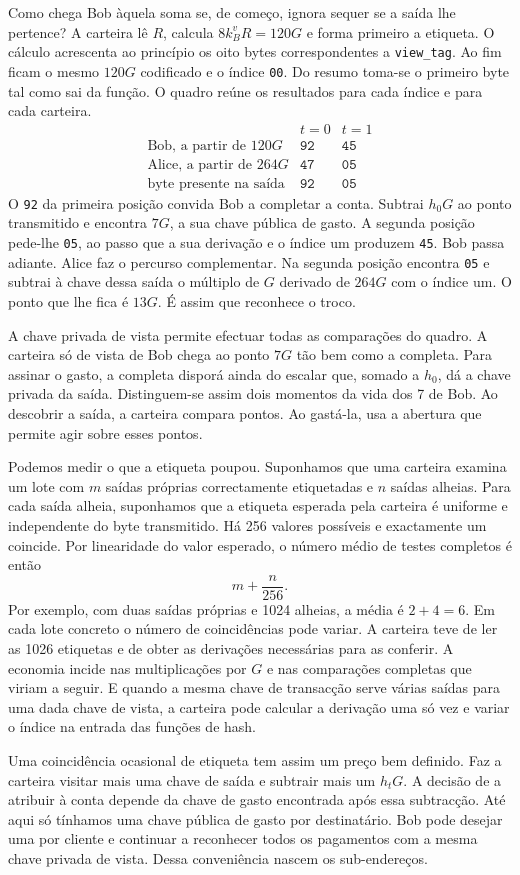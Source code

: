 Como chega Bob àquela soma se, de começo, ignora sequer se a saída
lhe pertence? A carteira lê \(R\), calcula \(8k_B^vR=120G\) e
forma primeiro a etiqueta. O cálculo acrescenta ao princípio os oito
bytes correspondentes a \texttt{view\_tag}. Ao fim ficam o mesmo
\(120G\) codificado e o índice \texttt{00}. Do resumo toma-se o
primeiro byte tal como sai da função. O quadro reúne os resultados
para cada índice e para cada carteira.
\[
\begin{array}{l|cc}
 &t=0&t=1\\ \hline
 \text{Bob, a partir de }120G &\texttt{92}&\texttt{45}\\
 \text{Alice, a partir de }264G &\texttt{47}&\texttt{05}\\ \hline
 \text{byte presente na saída}&\texttt{92}&\texttt{05}
\end{array}
\]
O \texttt{92} da primeira posição convida Bob a completar a conta.
Subtrai \(h_0G\) ao ponto transmitido e encontra \(7G\), a sua
chave pública de gasto. A segunda posição pede-lhe \texttt{05},
ao passo que a sua derivação e o índice um produzem \texttt{45}.
Bob passa adiante. Alice faz o percurso complementar. Na segunda
posição encontra \texttt{05} e subtrai à chave dessa saída o
múltiplo de \(G\) derivado de \(264G\) com o índice um. O ponto
que lhe fica é \(13G\). É assim que reconhece o troco.

A chave privada de vista permite efectuar todas as comparações do
quadro. A carteira só de vista de Bob chega ao ponto \(7G\) tão bem
como a completa. Para assinar o gasto, a completa disporá ainda do
escalar que, somado a \(h_0\), dá a chave privada da saída.
Distinguem-se assim dois momentos da vida dos 7 de Bob. Ao descobrir
a saída, a carteira compara pontos. Ao gastá-la, usa a abertura que
permite agir sobre esses pontos.

Podemos medir o que a etiqueta poupou. Suponhamos que uma carteira
examina um lote com \(m\) saídas próprias correctamente etiquetadas e
\(n\) saídas alheias. Para cada saída alheia, suponhamos que a
etiqueta esperada pela carteira é uniforme e independente do byte
transmitido. Há 256 valores possíveis e exactamente um coincide.
Por linearidade do valor esperado, o número médio de testes completos
é então
\[
                            m+\frac{n}{256}.
\]
Por exemplo, com duas saídas próprias e 1024 alheias, a média é
\(2+4=6\). Em cada lote concreto o número de coincidências pode
variar. A carteira teve de ler as 1026 etiquetas e de obter as
derivações necessárias para as conferir. A economia incide nas
multiplicações por \(G\) e nas comparações completas que viriam a
seguir. E quando a mesma chave de transacção serve várias saídas
para uma dada chave de vista, a carteira pode calcular a derivação
uma só vez e variar o índice na entrada das funções de hash.

Uma coincidência ocasional de etiqueta tem assim um preço bem
definido. Faz a carteira visitar mais uma chave de saída e subtrair
mais um \(h_tG\). A decisão de a atribuir à conta depende da chave
de gasto encontrada após essa subtracção. Até aqui só tínhamos uma
chave pública de gasto por destinatário. Bob pode desejar uma por
cliente e continuar a reconhecer todos os pagamentos com a mesma
chave privada de vista. Dessa conveniência nascem os sub-endereços.
